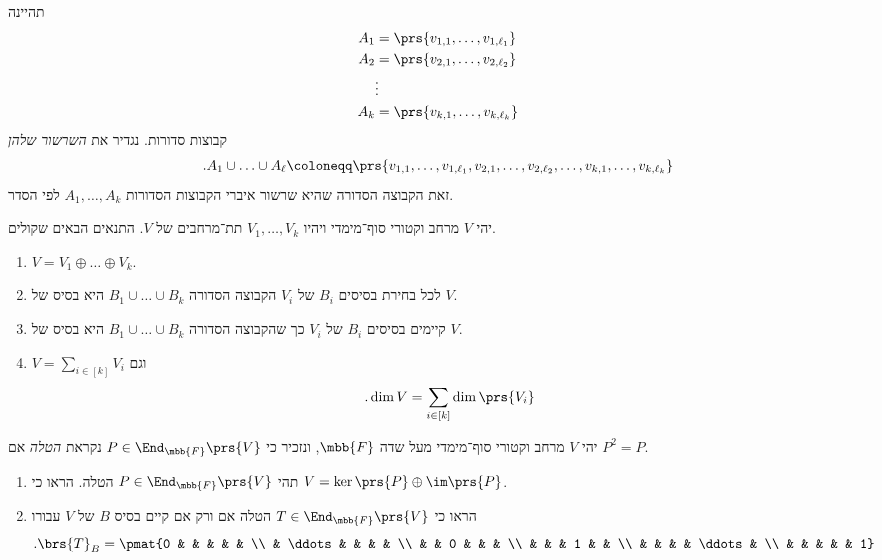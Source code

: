 \documentclass[a4paper,10pt,twoside,openany]{book}
\begin{document}
\begin{definition}
תהיינה
\begin{align*}
A_1 &= \prs{v_{1,1}, \ldots, v_{1, \ell_1}} \\
A_2 &= \prs{v_{2,1}, \ldots, v_{2, \ell_2}} \\
&\vdots \\
A_k &= \prs{v_{k,1}, \ldots, v_{k, \ell_k}}
\end{align*}
קבוצות סדורות.
נגדיר את
\emph{השרשור שלהן}
\begin{align*}
\text{.} A_1 \cup \ldots \cup A_{\ell} \coloneqq \prs{v_{1,1}, \ldots, v_{1,\ell_1}, v_{2,1}, \ldots, v_{2,\ell_2}, \ldots, v_{k,1}, \ldots, v_{k,\ell_k}}
\end{align*}
זאת הקבוצה הסדורה שהיא שרשור איברי הקבוצות הסדורות
$A_1, \ldots, A_k$
לפי הסדר.
\end{definition}

\begin{proposition}
יהי
$V$
מרחב וקטורי סוף־מימדי ויהיו
$V_1, \ldots, V_k$
תת־מרחבים של
$V$.
התנאים הבאים שקולים.
\begin{enumerate}
\item $V = V_1 \oplus \ldots \oplus V_k$.
\item לכל בחירת בסיסים
$B_i$
של
$V_i$
הקבוצה הסדורה
$B_1 \cup \ldots \cup B_k$
היא בסיס של
$V$.
\item קיימים בסיסים
$B_i$
של
$V_i$
כך שהקבוצה הסדורה
$B_1 \cup \ldots \cup B_k$
היא בסיס של
$V$.
\item $V = \sum_{i \in [k]} V_i$
וגם
\[\text{.} \dim V = \sum_{i \in [k]} \dim\prs{V_i}\]
\end{enumerate}
\end{proposition}

\newpage

\begin{exercise}
יהי
$V$
מרחב וקטורי סוף־מימדי מעל שדה
$\mbb{F}$,
ונזכיר כי
$P \in \End_{\mbb{F}}\prs{V}$
נקראת
\emph{הטלה}
אם
$P^2 = P$.

\begin{enumerate}
\item תהי
$P \in \End_{\mbb{F}}\prs{V}$
הטלה. הראו כי
$V = \ker\prs{P} \oplus \im\prs{P}$.

\item הראו כי
$T \in \End_{\mbb{F}}\prs{V}$
הטלה אם ורק אם קיים בסיס
$B$
של
$V$
עבורו
\[\text{.} \brs{T}_B = \pmat{0 & & & & & \\ & \ddots & & & & \\ & & 0 & & & \\ & & & 1 & & \\ & & & & \ddots & \\ & & & & & 1}\] 
\end{enumerate}
\end{exercise}
\end{document}
